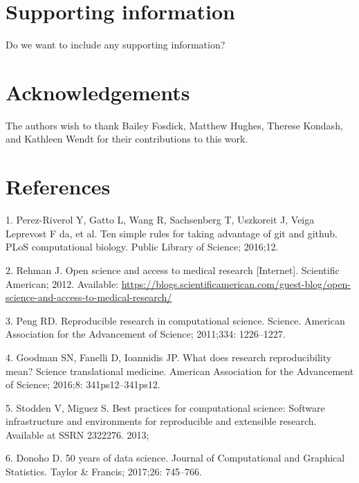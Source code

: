 \documentclass[10pt,letterpaper]{article}
\begin{document}
\hypertarget{supporting-information}{%
\section{Supporting information}\label{supporting-information}}

Do we want to include any supporting information?

\hypertarget{acknowledgements}{%
\section{Acknowledgements}\label{acknowledgements}}

The authors wish to thank Bailey Fosdick, Matthew Hughes, Therese
Kondash, and Kathleen Wendt for their contributions to this work.

\hypertarget{references}{%
\section*{References}\label{references}}

\hypertarget{refs}{}
\leavevmode\hypertarget{ref-perez2016}{}%
1. Perez-Riverol Y, Gatto L, Wang R, Sachsenberg T, Uszkoreit J, Veiga
Leprevost F da, et al. Ten simple rules for taking advantage of git and
github. PLoS computational biology. Public Library of Science; 2016;12.

\leavevmode\hypertarget{ref-rehman2012}{}%
2. Rehman J. Open science and access to medical research {[}Internet{]}.
Scientific American; 2012. Available:
\url{https://blogs.scientificamerican.com/guest-blog/open-science-and-access-to-medical-research/}

\leavevmode\hypertarget{ref-peng2011}{}%
3. Peng RD. Reproducible research in computational science. Science.
American Association for the Advancement of Science; 2011;334:
1226--1227.

\leavevmode\hypertarget{ref-goodman2016}{}%
4. Goodman SN, Fanelli D, Ioannidis JP. What does research
reproducibility mean? Science translational medicine. American
Association for the Advancement of Science; 2016;8: 341ps12--341ps12.

\leavevmode\hypertarget{ref-stodden2013}{}%
5. Stodden V, Miguez S. Best practices for computational science:
Software infrastructure and environments for reproducible and extensible
research. Available at SSRN 2322276. 2013;

\leavevmode\hypertarget{ref-donoho2017}{}%
6. Donoho D. 50 years of data science. Journal of Computational and
Graphical Statistics. Taylor \& Francis; 2017;26: 745--766.
\end{document}
